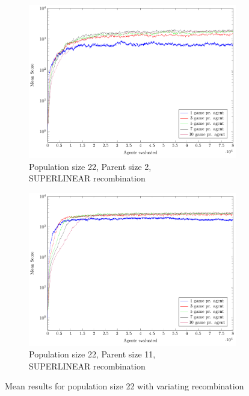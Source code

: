 \begin{figure}
\begin{subfigure}[b]{0.49\textwidth}
    \end{subfigure}
    \begin{subfigure}[b]{0.49\textwidth}
    	\centering
    	\caption{Population size 22, Parent size 2,\\SUPERLINEAR recombination}
        \includegraphics[width=\textwidth]{data/cma_population_offspring/22x_split/superlinear_l22_o2/mean/PlotFile.pdf}
    \end{subfigure}
    \begin{subfigure}[b]{0.49\textwidth}
    	\centering
    	\caption{Population size 22, Parent size 11,\\SUPERLINEAR recombination}
        \includegraphics[width=\textwidth]{data/cma_population_offspring/22x_split/superlinear_l22_o11/mean/PlotFile.pdf}
    \end{subfigure}
    
    \caption{Mean results for population size 22 with variating recombination}
\end{figure}

